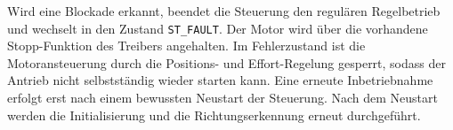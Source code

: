 Wird eine Blockade erkannt, beendet die Steuerung den regulären
Regelbetrieb und wechselt in den Zustand \texttt{ST\_FAULT}. Der Motor
wird über die vorhandene Stopp-Funktion des Treibers angehalten. Im
Fehlerzustand ist die Motoransteuerung durch die Positions- und
Effort-Regelung gesperrt, sodass der Antrieb nicht selbstständig wieder
starten kann. Eine erneute Inbetriebnahme erfolgt erst nach einem
bewussten Neustart der Steuerung. Nach dem Neustart werden die
Initialisierung und die Richtungserkennung erneut durchgeführt.




